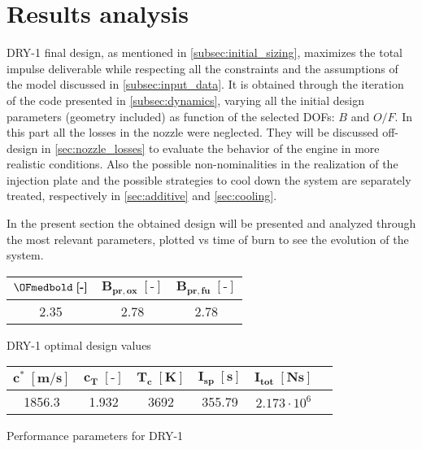 \section{Results analysis}
\label{sec:results}

DRY-1 final design, as mentioned in \autoref{subsec:initial_sizing}, maximizes the total impulse deliverable while respecting all the constraints and the assumptions of the model discussed in \autoref{subsec:input_data}.
It is obtained through the iteration of the code presented in \autoref{subsec:dynamics}, varying all the initial design parameters (geometry included) as function of the selected DOFs: $B$ and $O/F$.
In this part all the losses in the nozzle were neglected. They will be discussed off-design in \autoref{sec:nozzle_losses} to evaluate the behavior of the engine in more realistic conditions.
Also the possible non-nominalities in the realization of the injection plate and the possible strategies to cool down the system are separately treated, respectively in \autoref{sec:additive} and \autoref{sec:cooling}.

In the present section the obtained design will be presented and analyzed through the most relevant parameters, plotted vs time of burn to see the evolution of the system.

\vspace*{2cm}

\begin{minipage}{0.4\linewidth}
    \centering
    \small
    \captionsetup{type=table}
    \renewcommand{\arraystretch}{1.4}
    \begin{tabular}{|c|c|c|}
        \hline
        $\OFmedbold \; \boldsymbol{[\textbf{-}]}$   &
        $\boldsymbol{B_{pr,ox} \; [\textbf{-}]}$    &
        $\boldsymbol{B_{pr,fu} \; [\textbf{-}]}$    \\
        \hline
        \hline
        2.35 & 2.78 & 2.78 \\
        \hline
    \end{tabular}
    \caption{DRY-1 optimal design values}
    \label{table:OF_B_final}
\end{minipage}\hfill
\begin{minipage}{0.6\linewidth}
    \centering
    \small
    \captionsetup{type=table}
    \renewcommand{\arraystretch}{1.4}
    \begin{tabular}{|c|c|c|c|c|c|}
        \hline
        $\boldsymbol{c^* \; [\textbf{m/s}]}$        &
        $\boldsymbol{c_T \; [\textbf{-}]}$          &
        $\boldsymbol{T_c \; [\textbf{K}]}$          &
        $\boldsymbol{I_{sp} \; [\textbf{s}]}$       &
        $\boldsymbol{I_{tot} \; [\textbf{Ns}]}$     \\
        \hline
        \hline
        1856.3 & 1.932 & 3692 & 355.79 & $2.173 \cdot 10^6$ \\
        \hline
    \end{tabular}
    \caption{Performance parameters for DRY-1}
    \label{table:performance_values}
\end{minipage} 

